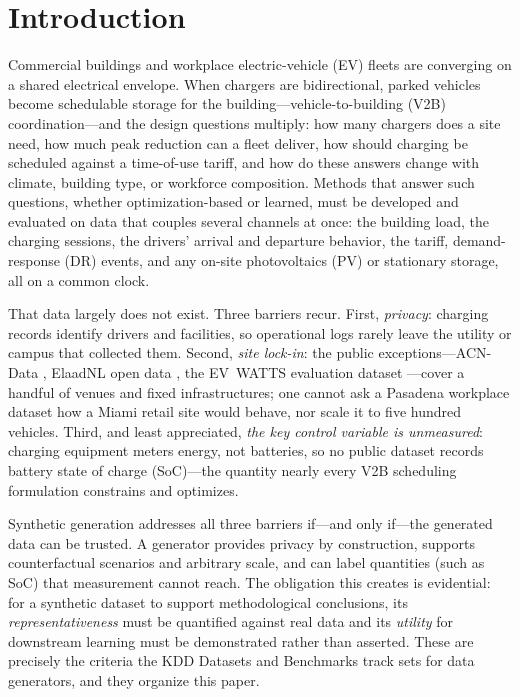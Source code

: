 \section{Introduction}
\label{sec:intro}

Commercial buildings and workplace electric-vehicle (EV) fleets are converging
on a shared electrical envelope. When chargers are bidirectional, parked
vehicles become schedulable storage for the building---vehicle-to-building
(V2B) coordination---and the design questions multiply: how many chargers does
a site need, how much peak reduction can a fleet deliver, how should charging
be scheduled against a time-of-use tariff, and how do these answers change
with climate, building type, or workforce composition. Methods that answer
such questions, whether optimization-based or learned, must be developed and
evaluated on data that couples several channels at once: the building load,
the charging sessions, the drivers' arrival and departure behavior, the
tariff, demand-response (DR) events, and any on-site photovoltaics (PV) or
stationary storage, all on a common clock.

That data largely does not exist. Three barriers recur. First,
\emph{privacy}: charging records identify drivers and facilities, so
operational logs rarely leave the utility or campus that collected them.
Second, \emph{site lock-in}: the public exceptions---ACN-Data
\citep{lee2019acn}, ElaadNL open data \citep{elaadnl2020}, the EV~WATTS
evaluation dataset \citep{evwatts2023}---cover a handful of venues and fixed
infrastructures; one cannot ask a Pasadena workplace dataset how a Miami
retail site would behave, nor scale it to five hundred vehicles. Third, and
least appreciated, \emph{the key control variable is unmeasured}: charging
equipment meters energy, not batteries, so no public dataset records battery
state of charge (SoC)---the quantity nearly every V2B scheduling formulation
constrains and optimizes.

Synthetic generation addresses all three barriers if---and only if---the
generated data can be trusted. A generator provides privacy by construction,
supports counterfactual scenarios and arbitrary scale, and can label
quantities (such as SoC) that measurement cannot reach. The obligation this
creates is evidential: for a synthetic dataset to support methodological
conclusions, its \emph{representativeness} must be quantified against real
data and its \emph{utility} for downstream learning must be demonstrated
rather than asserted. These are precisely the criteria the KDD Datasets and
Benchmarks track sets for data generators, and they organize this paper.

